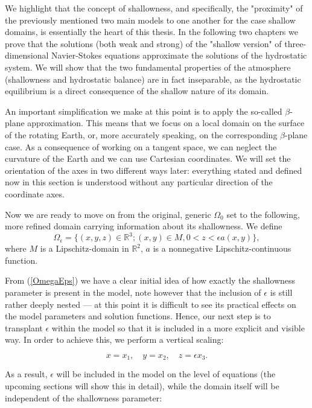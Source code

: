 \documentclass[12pt]{report}
\numberwithin{theorem}{chapter}
\numberwithin{corollary}{chapter}
\numberwithin{lemma}{chapter}
\numberwithin{remark}{chapter}
\numberwithin{definition}{chapter}
\numberwithin{prop}{chapter}
\begin{document}
We highlight that the concept of shallowness, and specifically, the "proximity" of the previously mentioned two main models to one another for the case shallow domains, is essentially the heart of this thesis. In the following two chapters we prove that the solutions (both weak and strong) of the "shallow version" of three-dimensional Navier-Stokes equations approximate the solutions of the hydrostatic system. We will show that the two fundamental properties of the atmosphere (shallowness and hydrostatic balance) are in fact inseparable, as the hydrostatic equilibrium is a direct consequence of the shallow nature of its domain.

An important simplification we make at this point is to apply the so-called $\beta$-plane approximation. This means that we focus on a local domain on the surface of the rotating Earth, or, more accurately speaking, on the corresponding $\beta$-plane case. As a consequence of working on a tangent space, we can neglect the curvature of the Earth and we can use Cartesian coordinates. We will set the orientation of the axes in two different ways later: everything stated and defined now in this section is understood without any particular direction of the coordinate axes.

Now we are ready to move on from the original, generic $\Omega_0$ set to the following, more refined domain carrying information about its shallowness. We define
%
\begin{equation} \label{OmegaEps}
  \Omega_{\epsilon} = \{(x,y,z) \in \mathbb{R}^3 ; (x,y) \in M, 0 < z < \epsilon a(x,y) \},
\end{equation}
%
where $M$ is a Lipschitz-domain in $\mathbb{R}^2$, $a$ is a nonnegative Lipschitz-continuous function.

From (\ref{OmegaEps}) we have a clear initial idea of how exactly the shallowness parameter is present in the model, note however that the inclusion of $\epsilon$ is still rather deeply nested --- at this point it is difficult to see its practical effects on the model parameters and solution functions. Hence, our next step is to transplant $\epsilon$ within the model so that it is included in a more explicit and visible way. In order to achieve this, we perform a vertical scaling:

\begin{equation}\label{scaling_eq_x}x=x_1, \quad y=x_2, \quad z=\epsilon x_3.\end{equation}

As a result, $\epsilon$ will be included in the model on the level of equations (the upcoming sections will show this in detail), while the domain itself will be independent of the shallowness parameter:
\end{document}
